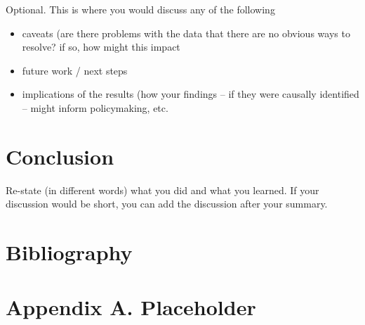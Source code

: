 \documentclass[12pt]{article}
\begin{document}
Optional. This is where you would discuss any of the following
\begin{itemize}
    \item caveats (are there problems with the data that there are no obvious ways to resolve? if so, how might this impact
    \item future work / next steps
    \item implications of the results (how your findings -- if they were causally identified -- might inform policymaking, etc.
\end{itemize}

\section{Conclusion}
\label{sec:conclusion}

Re-state (in different words) what you did and what you learned. If your discussion would be short, you can add the discussion after your summary.
\fi

\newpage
\section*{Bibliography}
\singlespacing
\setlength\bibsep{0pt}


\newpage
\section*{Appendix A. Placeholder} \label{sec:appendixa}
\end{document}
